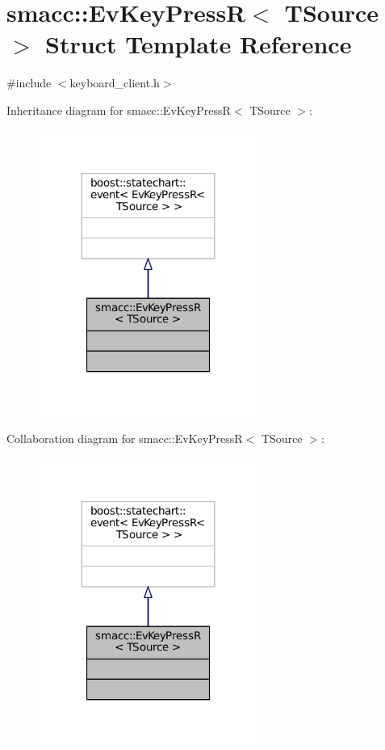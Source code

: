 \hypertarget{structsmacc_1_1EvKeyPressR}{}\section{smacc\+:\+:Ev\+Key\+PressR$<$ T\+Source $>$ Struct Template Reference}
\label{structsmacc_1_1EvKeyPressR}


{\ttfamily \#include $<$keyboard\+\_\+client.\+h$>$}



Inheritance diagram for smacc\+:\+:Ev\+Key\+PressR$<$ T\+Source $>$\+:
\nopagebreak
\begin{figure}[H]
\begin{center}
\leavevmode
\includegraphics[width=203pt]{structsmacc_1_1EvKeyPressR__inherit__graph}
\end{center}
\end{figure}


Collaboration diagram for smacc\+:\+:Ev\+Key\+PressR$<$ T\+Source $>$\+:
\nopagebreak
\begin{figure}[H]
\begin{center}
\leavevmode
\includegraphics[width=203pt]{structsmacc_1_1EvKeyPressR__coll__graph}
\end{center}
\end{figure}


